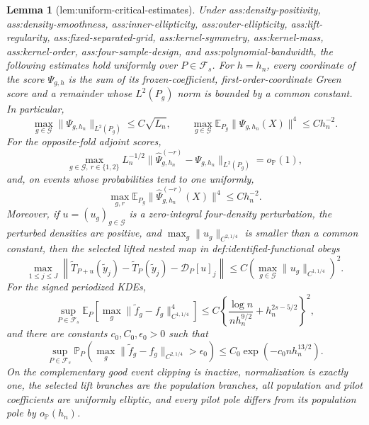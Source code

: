 \documentclass{article}
\newtheorem{lemma}{Lemma}
\begin{document}
\begin{lemma}[lem:uniform-critical-estimates]\label{lem:uniform-critical-estimates}
Under ass:density-positivity, ass:density-smoothness, ass:inner-ellipticity, ass:outer-ellipticity, ass:lift-regularity, ass:fixed-separated-grid, ass:kernel-symmetry, ass:kernel-mass, ass:kernel-order, ass:four-sample-design, and ass:polynomial-bandwidth, the following estimates hold uniformly over \(P\in\mathcal F_s\).  For \(h=h_n\), every coordinate of the score \(\Psi_{g,h}\) is the sum of its frozen-coefficient, first-order-coordinate Green score and a remainder whose \(L^2(P_g)\) norm is bounded by a common constant.  In particular,
\[
 \max_{g\in\mathcal G}\lVert\Psi_{g,h_n}\rVert_{L^2(P_g)}
 \leq C\sqrt{L_n},
 \qquad
 \max_{g\in\mathcal G}\mathbb E_{P_g}\lVert\Psi_{g,h_n}(X)\rVert^4
 \leq C h_n^{-2}.
\]
For the opposite-fold adjoint scores,
\[
 \max_{g\in\mathcal G,\ r\in\{1,2\}}
 L_n^{-1/2}
 \lVert\widehat\Psi_{g,h_n}^{(-r)}-\Psi_{g,h_n}\rVert_{L^2(P_g)}
 =o_{\mathbb P}(1),
\]
and, on events whose probabilities tend to one uniformly,
\[
 \max_{g,r}\mathbb E_{P_g}
 \lVert\widehat\Psi_{g,h_n}^{(-r)}(X)\rVert^4
 \leq C h_n^{-2}.
\]
Moreover, if \(u=(u_g)_{g\in\mathcal G}\) is a zero-integral four-density perturbation, the perturbed densities are positive, and \(\max_g\lVert u_g\rVert_{C^{2,1/4}}\) is smaller than a common constant, then the selected lifted nested map in def:identified-functional obeys
\[
 \max_{1\leq j\leq J}
 \left\lVert
 \widetilde T_{P+u}(\widetilde y_j)-\widetilde T_P(\widetilde y_j)
 -\mathcal D_P[u]_j
 \right\rVert
 \leq C\left(\max_{g\in\mathcal G}
 \lVert u_g\rVert_{C^{1,1/4}}\right)^2.
\]
For the signed periodized KDEs,
\[
 \sup_{P\in\mathcal F_s}
 \mathbb E_P\left[\max_g
 \lVert\widetilde f_g-f_g\rVert_{C^{1,1/4}}^4\right]
 \leq C\left\{
 \frac{\log n}{n h_n^{9/2}}+h_n^{2s-5/2}
 \right\}^2,
\]
and there are constants \(c_0,C_0,\epsilon_0>0\) such that
\[
 \sup_{P\in\mathcal F_s}\mathbb P_P\left(
 \max_g\lVert\widetilde f_g-f_g\rVert_{C^{2,1/4}}>\epsilon_0
 \right)
 \leq C_0\exp(-c_0 n h_n^{13/2}).
\]
On the complementary good event clipping is inactive, normalization is exactly one, the selected lift branches are the population branches, all population and pilot coefficients are uniformly elliptic, and every pilot pole differs from its population pole by \(o_{\mathbb P}(h_n)\).
\end{lemma}
\end{document}
